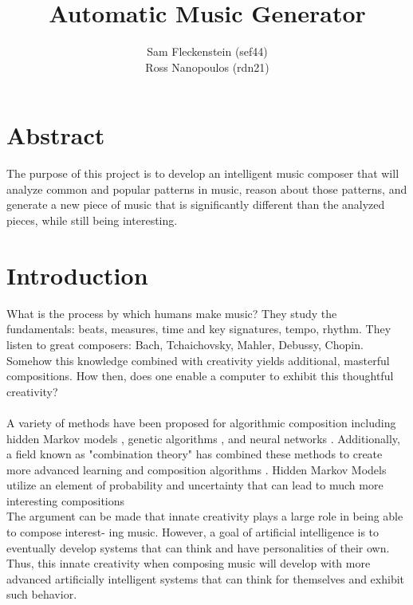 \documentclass{article}
\begin{document}
\clearpage
{}
\begin{center}
\begin{minipage}{.6\textwidth}

\title{Automatic Music Generator \\ \vspace{2 pt} }
\author{Sam Fleckenstein (sef44) \\ Ross Nanopoulos (rdn21)}
\maketitle

\end{minipage}
\end{center}
\clearpage

\tableofcontents
\newpage

\section{Abstract}
The purpose of this project is to develop an intelligent music composer that will analyze common and 
popular patterns in music, reason about those patterns, and generate a new piece of music that is 
significantly different than the analyzed pieces, while still being interesting.

\newpage

\section{Introduction}
What is the process by which humans make music? They study the fundamentals: beats, measures, time
and key signatures, tempo, rhythm. They listen to great composers: Bach, Tchaichovsky, Mahler, Debussy,
Chopin. Somehow this knowledge combined with creativity yields additional, masterful compositions. How
then, does one enable a computer to exhibit this thoughtful creativity?\\
\\
A variety of methods have been proposed for algorithmic composition including hidden Markov models 
\cite{5492670}, genetic algorithms \cite{514161}, and neural networks \cite{4667040}. Additionally, 
a field known as "combination theory" has combined these methods to create more advanced learning and 
composition algorithms \cite{4626654}. Hidden Markov Models utilize an element of probability and 
uncertainty that can lead to much more interesting compositions
\\
The argument can be made that innate creativity plays a large role in being able to compose interest-
ing music. However, a goal of artificial intelligence is to eventually develop systems that can think and
have personalities of their own. Thus, this innate creativity when composing music will develop with more
advanced artificially intelligent systems that can think for themselves and exhibit such behavior.
\end{document}
